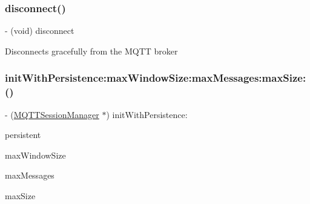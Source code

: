 \subsubsection{\texorpdfstring{disconnect()}{disconnect()}}
{\footnotesize\ttfamily -\/ (void) disconnect \begin{DoxyParamCaption}{ }\end{DoxyParamCaption}}

Disconnects gracefully from the M\+Q\+TT broker \mbox{\label{interface_m_q_t_t_session_manager_ae57cebdca6694242b821cf089fea458d}} 
\subsubsection{\texorpdfstring{init\+With\+Persistence\+:max\+Window\+Size\+:max\+Messages\+:max\+Size\+:()}{initWithPersistence:maxWindowSize:maxMessages:maxSize:()}}
{\footnotesize\ttfamily -\/ (\hyperlink{interface_m_q_t_t_session_manager}{M\+Q\+T\+T\+Session\+Manager} $\ast$) init\+With\+Persistence\+: \begin{DoxyParamCaption}\item[{(B\+O\+OL)}]{persistent }\item[{maxWindowSize:(N\+S\+U\+Integer)}]{max\+Window\+Size }\item[{maxMessages:(N\+S\+U\+Integer)}]{max\+Messages }\item[{maxSize:(N\+S\+U\+Integer)}]{max\+Size }\end{DoxyParamCaption}}

